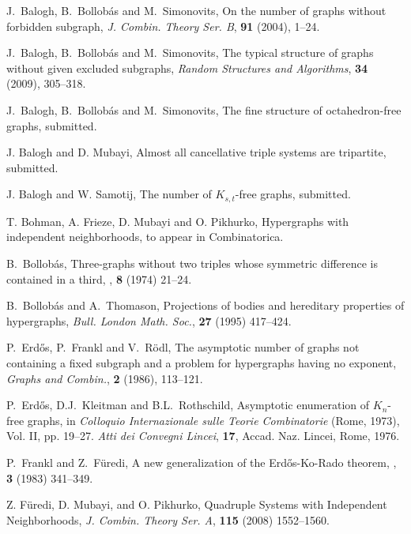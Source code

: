 \documentclass[11pt]{article}
\begin{document}
\begin{thebibliography}{99}






 J.~Balogh, B.~Bollob\'as and M.~Simonovits,
On the number of graphs without forbidden subgraph, {\em J. Combin. Theory Ser. B}, \textbf{91} (2004), 1--24.

 J.~Balogh, B.~Bollob\'as and M.~Simonovits, The typical structure of graphs without given excluded
subgraphs, \emph{Random Structures and Algorithms},
     {\bf 34} {(2009)}, {305--318}.

 J.~Balogh, B.~Bollob\'as and M.~Simonovits, The fine structure of octahedron-free graphs, submitted.

 J. Balogh and D. Mubayi, Almost all cancellative triple systems
are tripartite, submitted.

 J. Balogh and W. Samotij, The number of $K_{s,t}$-free graphs, submitted.

 T. Bohman, A. Frieze, D. Mubayi and O. Pikhurko, Hypergraphs with independent neighborhoods, to appear in
Combinatorica.

B.~{Bollob\'as},
\newblock Three-graphs without two triples whose symmetric difference is
  contained in a third,
, {\bf 8} (1974) 21--24.

  B.~Bollob\'as and A.~Thomason,  Projections of bodies and hereditary  properties of hypergraphs,
{\em Bull. London Math. Soc.}, {\bf 27} (1995) 417--424.

 P.~Erd\H{o}s, P.~Frankl and V.~R\"odl, The asymptotic number of graphs not
containing a fixed subgraph and a problem for hypergraphs having no exponent, {\em Graphs and Combin.},
{\bf 2} (1986), 113--121.

 P.~Erd\H{o}s, D.J.~Kleitman and B.L.~Rothschild, Asymptotic enumeration of $K_{n}$-free graphs,
in {\em  Colloquio Internazionale sulle Teorie Combinatorie} (Rome, 1973), Vol. II, pp. 19--27.
{\em Atti dei Convegni Lincei}, {\bf 17}, Accad. Naz. Lincei, Rome, 1976.



P.~Frankl and Z.~F{\"u}redi,
\newblock A new generalization of the {E}rd{\H o}s-{K}o-{R}ado theorem,
, {\bf 3} (1983) 341--349.


 Z. F\"uredi, D. Mubayi, and O. Pikhurko, Quadruple Systems with Independent Neighborhoods,
 {\em J. Combin. Theory Ser. A}, {\bf 115} (2008) 1552--1560.


\end{thebibliography}
\end{document}
